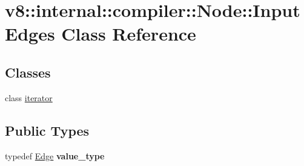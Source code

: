 \hypertarget{classv8_1_1internal_1_1compiler_1_1_node_1_1_input_edges}{}\section{v8\+:\+:internal\+:\+:compiler\+:\+:Node\+:\+:Input\+Edges Class Reference}
\label{classv8_1_1internal_1_1compiler_1_1_node_1_1_input_edges}
\subsection*{Classes}
\begin{DoxyCompactItemize}
\item 
class \hyperlink{classv8_1_1internal_1_1compiler_1_1_node_1_1_input_edges_1_1iterator}{iterator}
\end{DoxyCompactItemize}
\subsection*{Public Types}
\begin{DoxyCompactItemize}
\item 
typedef \hyperlink{classv8_1_1internal_1_1compiler_1_1_edge}{Edge} {\bfseries value\+\_\+type}\hypertarget{classv8_1_1internal_1_1compiler_1_1_node_1_1_input_edges_a0976a27bc1312135f762d372111e0e4b}{}\label{classv8_1_1internal_1_1compiler_1_1_node_1_1_input_edges_a0976a27bc1312135f762d372111e0e4b}

\end{DoxyCompactItemize}
